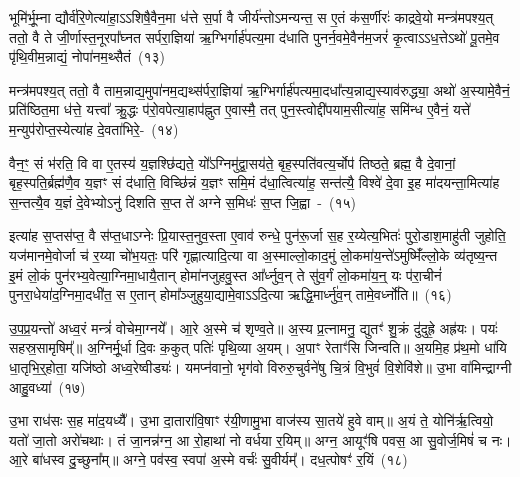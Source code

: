 भूमि॑र्भू॒म्ना द्यौर्व॑रि॒णेत्या॑हा॒\-ऽऽ\-शिषै॒वैन॒मा ध॑त्ते स॒र्पा वै जीर्य॑न्तो\-ऽमन्यन्त॒ स ए॒तं क॑स॒र्णीरः॑ काद्रवे॒यो मन्त्र॑मपश्य॒त् ततो॒ वै ते जी॒र्णास्त॒नूरपा᳚घ्नत सर्परा॒ज्ञिया॑ ऋ॒ग्भिर्गार्\mbox{}ह॑पत्य॒मा द॑धाति पुनर्न॒वमे॒वैन॑म॒जरं॑ कृ॒त्वा\-ऽऽ\-ध॒त्ते\-ऽथो॑ पू॒तमे॒व पृ॑थि॒वीम॒न्नाद्यं॒ नोपा॑नम॒थ्सैतं~(१३)

मन्त्र॑मपश्य॒त् ततो॒ वै ताम॒न्नाद्य॒मुपा॑\-नम॒द्यथ्स॑र्परा॒ज्ञिया॑ ऋ॒ग्भिर्गार्\mbox{}ह॑पत्यमा॒दधा᳚त्य॒न्नाद्य॒स्या\-व॑रुद्ध्या॒ अथो॑ अ॒स्यामे॒वैनं॒ प्रति॑ष्ठित॒मा ध॑त्ते॒ यत्त्वा᳚ क्रु॒द्धः प॑रो॒वपेत्या॒हाप॑ह्नुत ए॒वास्मै॒ तत् पुन॒स्त्वोद्दी॑पयाम॒सीत्या॑ह॒ समि॑न्ध ए॒वैनं॒ यत्ते॑ म॒न्युप॑रोप्त॒स्येत्या॑ह दे॒वता॑भिरे॒-~(१४)

वैन॒ꣳ॒ सं भ॑रति॒ वि वा ए॒तस्य॑ य॒ज्ञश्छि॑द्यते॒ यो᳚\-ऽग्निमु॑द्वा॒सय॑ते॒ बृह॒स्पति॑वत्य॒र्चोप॑ तिष्ठते॒ ब्रह्म॒ वै दे॒वानां॒ बृह॒स्पति॒र्ब्रह्म॑णै॒व य॒ज्ञꣳ सं द॑धाति॒ विच्छि॑न्नं य॒ज्ञꣳ समि॒मं द॑धा॒त्वित्या॑ह॒ सन्त॑त्यै॒ विश्वे॑ दे॒वा इ॒ह मा॑दयन्ता॒मित्या॑ह स॒न्तत्यै॒व य॒ज्ञं दे॒वेभ्यो\-ऽनु॑ दिशति स॒प्त ते॑ अग्ने स॒मिधः॑ स॒प्त जि॒ह्वा~-~(१५)

इत्या॑ह स॒प्तस॑प्त॒ वै स॑प्त॒धा\-ऽग्नेः प्रि॒यास्त॒नुव॒स्ता ए॒वाव॑ रुन्धे॒ पुन॑रू॒र्जा स॒ह र॒य्येत्य॒भितः॑ पुरो॒डाश॒माहु॑ती जुहोति॒ यज॑मानमे॒वोर्जा च॑ र॒य्या चो॑भ॒यतः॒ परि॑ गृह्णात्यादि॒त्या वा अ॒स्माल्लो॒काद॒मुं लो॒कमा॑य॒न्ते॑\-ऽमुष्मिँ॑ल्लो॒के व्य॑तृष्य॒न्त इ॒मं लो॒कं पुन॑रभ्य॒\-वेत्या॒ग्नि\-मा॒धायै॒तान् होमा॑नजुहवु॒स्त आ᳚र्ध्नुव॒न् ते सु॑व॒र्गं लो॒कमा॑य॒न्॒ यः प॑रा॒चीनं॑ पुनरा॒धेया॑द॒ग्निमा॒दधी॑त॒ स ए॒तान् होमा᳚ञ्जुहुया॒द्यामे॒वा\-ऽऽ\-दि॒त्या ऋद्धि॒मार्ध्नु॑व॒न् तामे॒वर्ध्नो॑ति॥~(१६)

{\anuvakamend[{ए॒तमे॒व जि॒ह्वा ए॒तान् पञ्च॑विꣳशतिश्च}]}%

उ॒प॒प्र॒यन्तो॑ अध्व॒रं मन्त्रं॑ वोचेमा॒ग्नये᳚। आ॒रे अ॒स्मे च॑ शृण्व॒ते॥ अ॒स्य प्र॒त्नामनु॒ द्युतꣳ॑ शु॒क्रं दु॑दुह्रे॒ अह्र॑यः। पयः॑ सहस्र॒सामृषिम्᳚॥ अ॒ग्निर्मू॒र्धा दि॒वः क॒कुत् पतिः॑ पृथि॒व्या अ॒यम्। अ॒पाꣳ रेताꣳ॑सि जिन्वति॥ अ॒यमि॒ह प्र॑थ॒मो धा॑यि धा॒तृभि॒र्॒\mbox{}होता॒ यजि॑ष्ठो अध्व॒रेष्वीड्यः॑। यमप्न॑वानो॒ भृग॑वो विरुरु॒चुर्वने॑षु चि॒त्रं वि॒भुवं॑ वि॒शेवि॑शे॥ उ॒भा वा॑मिन्द्राग्नी आहु॒वध्या॑~(१७)

उ॒भा राध॑सः स॒ह मा॑द॒यध्यै᳚। उ॒भा दा॒तारा॑वि॒षाꣳ र॑यी॒णामु॒भा वाज॑स्य सा॒तये॑ हुवे वाम्॥ अ॒यं ते॒ योनि॑र्\mbox{}ऋ॒त्वियो॒ यतो॑ जा॒तो अरो॑चथाः। तं जा॒नन्न॑ग्न॒ आ रो॒हाथा॑ नो वर्धया र॒यिम्॥ अग्न॒ आयूꣳ॑षि पवस॒ आ सु॒वोर्ज॒मिषं॑ च नः। आ॒रे बा॑धस्व दु॒च्छुना᳚म्॥ अग्ने॒ पव॑स्व॒ स्वपा॑ अ॒स्मे वर्चः॑ सु॒वीर्यम्᳚। दध॒त्पोषꣳ॑ र॒यिं~(१८)

